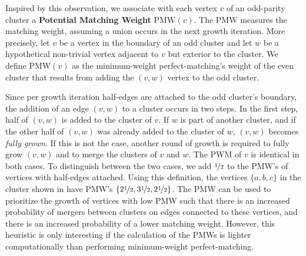 Inspired by this observation, we associate with each vertex $v$ of an odd-parity cluster a \textbf{Potential Matching Weight} $\text{PMW}(v)$. The PMW measures the matching weight, assuming a union occurs in the next growth iteration. More precisely,
let $v$ be a vertex in the boundary of an odd cluster and let $w$ be a hypothetical non-trivial vertex adjacent to $v$ but exterior to the cluster. We define $\text{PMW}(v)$ as the minimum-weight perfect-matching's weight of the even cluster that results from adding the $(v,w)$ vertex to the odd cluster. %
    
Since per growth iteration half-edges are attached to the odd cluster's boundary, the addition of an edge $(v,w)$ to a cluster occurs in two steps. In the first step, half of $(v,w)$ is added to the cluster of $v$. If $w$ is part of another cluster, and if the other half of $(v,w)$ was already added to the cluster of $w$, $(v,w)$ becomes \emph{fully grown}. If this is not the case, another round of growth is required to fully grow $(v,w)$ and to merge the clusters of $v$ and $w$. The PWM of $v$ is identical in both cases. To distinguish between the two cases, we add $\nicefrac{1}{2}$ to the PMW's of vertices with half-edges attached. Using this definition, the vertices $\{a,b,c\}$ in the cluster shown in  have PMW's $\{2\nicefrac{1}{2}, 3\nicefrac{1}{2}, 2\nicefrac{1}{2}\}$. The PMW can be used to prioritize the growth of vertices with low PMW such that there is an increased probability of mergers between clusters on edges connected to these vertices, and there is an increased probability of a lower matching weight. However, this heuristic is only interesting if the calculation of the PMWs is lighter computationally than performing minimum-weight perfect-matching. %


